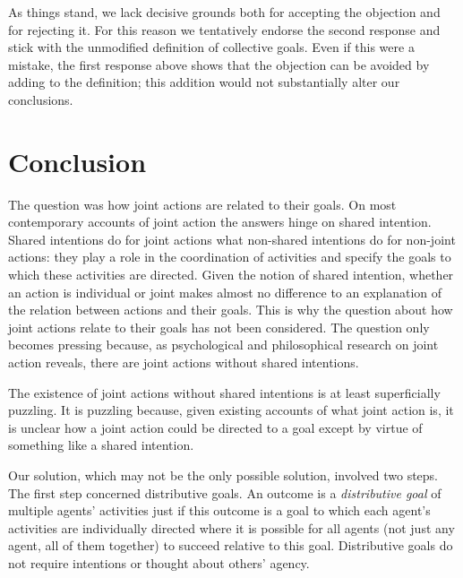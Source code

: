 \documentclass[12pt,a4paper]{extarticle}
\begin{document}
As things stand, we lack decisive grounds both for accepting the objection and for rejecting it.
For this reason we tentatively endorse the second response and stick with the unmodified definition of collective goals.
Even if this were a mistake, the first response above shows that the objection can be avoided by adding to the definition; this addition would not substantially alter our conclusions.


\section{Conclusion}

The question was how joint actions are related to their goals.
On most contemporary accounts of joint action the answers hinge on shared intention.
Shared intentions do  for joint actions what non-shared intentions do for non-joint actions: they play a role in the coordination of activities and specify the goals to which these activities are directed.
Given the notion of shared intention, whether an action is individual or joint makes almost no difference to an explanation of  the relation between actions and their goals.
This is why the question about how  joint actions relate to their goals has not been considered.  
The question only becomes pressing because, as psychological and philosophical research on joint action reveals, there are joint actions without shared intentions.

The existence of joint actions without shared intentions is at least superficially puzzling.
It is puzzling because, 
given existing accounts of what joint action is, 
it is unclear how a joint action could be directed to a goal except by virtue of something like a shared intention.

Our solution, which may not be the only possible solution, involved two steps.  
The first step concerned distributive goals.  
An outcome is a \emph{distributive goal} of multiple agents' activities just if this outcome is a goal to which each agent's activities are individually directed where it is possible for all agents  (not just any agent, all of them together) to succeed relative to this goal.
Distributive goals  do not require intentions or thought about others' agency.
\end{document}
